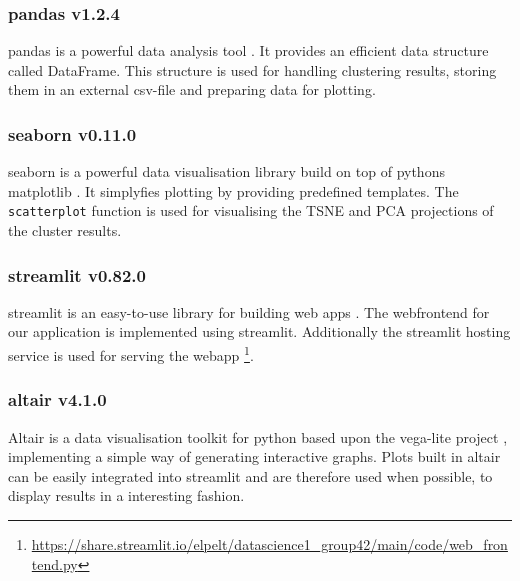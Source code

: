 \subsubsection[pandas]{pandas v1.2.4}
pandas is a powerful data analysis tool \cite{mckinney-proc-scipy-2010, reback2020pandas}. It provides an efficient data structure called DataFrame. This structure is used for handling clustering results, storing them in an external csv-file and preparing data for plotting. 

\subsubsection[seaborn]{seaborn v0.11.0}
seaborn is a powerful data visualisation library build on top of pythons matplotlib \cite{seaborn}. It simplyfies plotting by providing predefined templates.  The \texttt{scatterplot} function is used for visualising the TSNE and PCA projections of the cluster results.

\subsubsection[streamlit]{streamlit v0.82.0}
streamlit is an easy-to-use library for building web apps \cite{streamlit}. The webfrontend for our application is implemented using streamlit. Additionally the streamlit hosting service is used for serving the webapp \footnote{\url{https://share.streamlit.io/elpelt/datascience1_group42/main/code/web_frontend.py}}.

\subsubsection[altair]{altair v4.1.0}
Altair \cite{VanderPlas2018} is a data visualisation toolkit for python based upon the vega-lite project \cite{Satyanarayan2017}, implementing a simple way of generating interactive graphs. Plots built in altair can be easily integrated into streamlit and are therefore used when possible, to display results in a interesting fashion.
